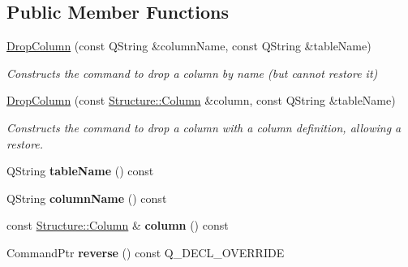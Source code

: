 \subsection*{Public Member Functions}
\begin{DoxyCompactItemize}
\item 
\mbox{\label{class_q_sql_migrator_1_1_commands_1_1_drop_column_a86446f01512daae2f643cfffcd4c3604}} 
\hyperlink{class_q_sql_migrator_1_1_commands_1_1_drop_column_a86446f01512daae2f643cfffcd4c3604}{Drop\+Column} (const Q\+String \&column\+Name, const Q\+String \&table\+Name)
\begin{DoxyCompactList}\small\item\em Constructs the command to drop a column by name (but cannot restore it) \end{DoxyCompactList}\item 
\mbox{\label{class_q_sql_migrator_1_1_commands_1_1_drop_column_abf379920350d2e15ad7917dd2d27d9e8}} 
\hyperlink{class_q_sql_migrator_1_1_commands_1_1_drop_column_abf379920350d2e15ad7917dd2d27d9e8}{Drop\+Column} (const \hyperlink{class_q_sql_migrator_1_1_structure_1_1_column}{Structure\+::\+Column} \&column, const Q\+String \&table\+Name)
\begin{DoxyCompactList}\small\item\em Constructs the command to drop a column with a column definition, allowing a restore. \end{DoxyCompactList}\item 
\mbox{\label{class_q_sql_migrator_1_1_commands_1_1_drop_column_af3f92bd1ca3e275f3c8cc57cf70bbc13}} 
Q\+String {\bfseries table\+Name} () const
\item 
\mbox{\label{class_q_sql_migrator_1_1_commands_1_1_drop_column_afd3c2ddc342a9c2480b8b5c3ca3addb2}} 
Q\+String {\bfseries column\+Name} () const
\item 
\mbox{\label{class_q_sql_migrator_1_1_commands_1_1_drop_column_a4642dc7bbefa309fed15a950110f962a}} 
const \hyperlink{class_q_sql_migrator_1_1_structure_1_1_column}{Structure\+::\+Column} \& {\bfseries column} () const
\item 
\mbox{\label{class_q_sql_migrator_1_1_commands_1_1_drop_column_acae37beeec7fc8fce0660de2b4ef280c}} 
Command\+Ptr {\bfseries reverse} () const Q\+\_\+\+D\+E\+C\+L\+\_\+\+O\+V\+E\+R\+R\+I\+DE
\end{DoxyCompactItemize}
